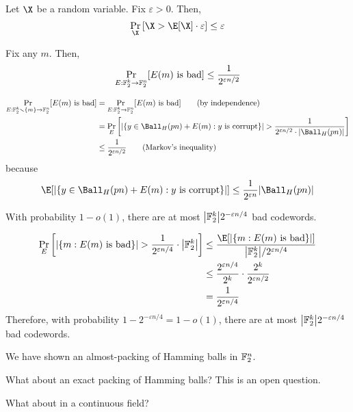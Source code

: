 \documentclass[class=co432,notes,tikz]{agony}
\begin{document}
\begin{theorem}
  Let $\X$ be a random variable. Fix $\varepsilon > 0$. Then,
  \[ \Pr_{\X}\qty[\X > \E[\X] \cdot \varepsilon] \leq \varepsilon \]
\end{theorem}

\begin{claim}
  Fix any $m$. Then,
  \[
    \Pr_{E : \mathbb{F}_2^k \to \mathbb{F}_2^n} [\text{$E(m)$ is bad}] \leq \frac{1}{2^{\varepsilon n / 2}}
  \]
\end{claim}
\begin{prf}
  \begin{align*}
    \Pr_{E : \F_2^k  \setminus \{m\} \to \F_2^n} [\text{$E(m)$ is bad}]
     & = \Pr_{E : \F_2^k \to \F_2^n} [\text{$E(m)$ is bad}] \tag{by independence}                                                        \\
     & = \Pr_{E}\qty[\abs{\{y \in \Ball_H(pn) + E(m) : \text{$y$ is corrupt}\}} > \frac{1}{2^{\varepsilon n/2} \cdot \abs{\Ball_H(pn)}}] \\
     & \leq \frac{1}{2^{\varepsilon n/2}} \tag{Markov's inequality}
  \end{align*}
  because
  \begin{align*}
    \E[\abs{\{y \in \Ball_H(pn) + E(m) : \text{$y$ is corrupt}\}}]
    \leq \frac{1}{2^{\varepsilon n}}\abs{\Ball_H(pn)}
  \end{align*}
\end{prf}

\begin{prop}
  With probability $1-o(1)$, there are at most $\abs{\mathbb{F}_2^k}2^{-\varepsilon n/4}$ bad codewords.
\end{prop}
\begin{prf}
  \begin{align*}
    \Pr_E\qty[\abs{\{m : \text{$E(m)$ is bad}\}} > \frac{1}{2^{\varepsilon n/4}}\cdot\abs{\F_2^k}]
     & \leq \frac{\E[\abs{\{m : \text{$E(m)$ is bad}\}}]}{\abs{\F_2^k}/2^{\varepsilon n/4}} \\
     & \leq \frac{2^{\varepsilon n/4}}{2^k} \cdot \frac{2^k}{2^{\varepsilon n/2}}           \\
     & = \frac{1}{2^{\varepsilon n/4}}
  \end{align*}
  Therefore, with probability $1-2^{-\varepsilon n/4} = 1-o(1)$,
  there are at most $\abs{\mathbb{F}_2^k}2^{-\varepsilon n/4}$ bad codewords.
\end{prf}

\begin{problem}
  We have shown an almost-packing of Hamming balls in $\mathbb{F}_2^n$.

  What about an exact packing of Hamming balls?
  This is an open question.

  What about in a continuous field?
\end{problem}
\end{document}
